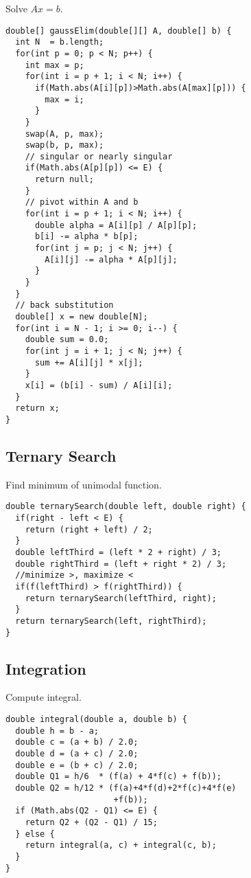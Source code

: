 Solve $Ax = b$. \\

\begin{lstlisting}
double[] gaussElim(double[][] A, double[] b) {
  int N  = b.length;
  for(int p = 0; p < N; p++) {
    int max = p;
    for(int i = p + 1; i < N; i++) {
      if(Math.abs(A[i][p])>Math.abs(A[max][p])) {
        max = i;
      } 
    }
    swap(A, p, max);
    swap(b, p, max);
    // singular or nearly singular
    if(Math.abs(A[p][p]) <= E) {
      return null;
    }
    // pivot within A and b
    for(int i = p + 1; i < N; i++) {
      double alpha = A[i][p] / A[p][p];
      b[i] -= alpha * b[p];
      for(int j = p; j < N; j++) {
        A[i][j] -= alpha * A[p][j];
      }
    }
  }
  // back substitution
  double[] x = new double[N];
  for(int i = N - 1; i >= 0; i--) {
    double sum = 0.0;
    for(int j = i + 1; j < N; j++) {
      sum += A[i][j] * x[j];
    }
    x[i] = (b[i] - sum) / A[i][i];
  }
  return x;
}
\end{lstlisting}

\subsection{Ternary Search}

Find minimum of unimodal function. \\

\begin{lstlisting}
double ternarySearch(double left, double right) {
  if(right - left < E) {
    return (right + left) / 2;
  }
  double leftThird = (left * 2 + right) / 3;
  double rightThird = (left + right * 2) / 3;
  //minimize >, maximize <
  if(f(leftThird) > f(rightThird)) { 
    return ternarySearch(leftThird, right);
  }			   
  return ternarySearch(left, rightThird);
}
\end{lstlisting}

\subsection{Integration}

Compute integral. \\

\begin{lstlisting}
double integral(double a, double b) {
  double h = b - a;
  double c = (a + b) / 2.0;
  double d = (a + c) / 2.0;
  double e = (b + c) / 2.0;
  double Q1 = h/6  * (f(a) + 4*f(c) + f(b));
  double Q2 = h/12 * (f(a)+4*f(d)+2*f(c)+4*f(e)  
                      +f(b));
  if (Math.abs(Q2 - Q1) <= E) {
    return Q2 + (Q2 - Q1) / 15;
  } else {        	
    return integral(a, c) + integral(c, b);
  }
}
\end{lstlisting}
